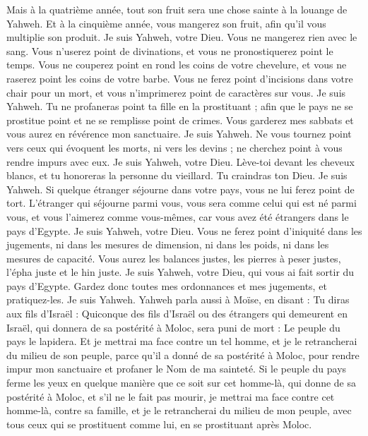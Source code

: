 \begin{multicols}{2}
Mais à la quatrième année, tout son fruit sera une chose sainte à la louange de Yahweh.
Et à la cinquième année, vous mangerez son fruit, afin qu'il vous multiplie son produit. Je suis Yahweh, votre Dieu.
Vous ne mangerez rien avec le sang. Vous n'userez point de divinations, et vous ne pronostiquerez point le temps.
Vous ne couperez point en rond les coins de votre chevelure, et vous ne raserez point les coins de votre barbe.
Vous ne ferez point d'incisions dans votre chair pour un mort, et vous n'imprimerez point de caractères sur vous. Je suis Yahweh.
Tu ne profaneras point ta fille en la prostituant ; afin que le pays ne se prostitue point et ne se remplisse point de crimes.
Vous garderez mes sabbats et vous aurez en révérence mon sanctuaire. Je suis Yahweh.
Ne vous tournez point vers ceux qui évoquent les morts, ni vers les devins ; ne cherchez point à vous rendre impurs avec eux. Je suis Yahweh, votre Dieu.
Lève-toi devant les cheveux blancs, et tu honoreras la personne du vieillard. Tu craindras ton Dieu. Je suis Yahweh.
Si quelque étranger séjourne dans votre pays, vous ne lui ferez point de tort.
L'étranger qui séjourne parmi vous, vous sera comme celui qui est né parmi vous, et vous l'aimerez comme vous-mêmes, car vous avez été étrangers dans le pays d'Egypte. Je suis Yahweh, votre Dieu.
Vous ne ferez point d'iniquité dans les jugements, ni dans les mesures de dimension, ni dans les poids, ni dans les mesures de capacité.
Vous aurez les balances justes, les pierres à peser justes, l'épha juste et le hin juste. Je suis Yahweh, votre Dieu, qui vous ai fait sortir du pays d'Egypte.
Gardez donc toutes mes ordonnances et mes jugements, et pratiquez-les. Je suis Yahweh.
\VerseOne{}Yahweh parla aussi à Moïse, en disant :
Tu diras aux fils d'Israël : Quiconque des fils d'Israël ou des étrangers qui demeurent en Israël, qui donnera de sa postérité à Moloc, sera puni de mort : Le peuple du pays le lapidera.
Et je mettrai ma face contre un tel homme, et je le retrancherai du milieu de son peuple, parce qu'il a donné de sa postérité à Moloc, pour rendre impur mon sanctuaire et profaner le Nom de ma sainteté.
Si le peuple du pays ferme les yeux en quelque manière que ce soit sur cet homme-là, qui donne de sa postérité à Moloc, et s'il ne le fait pas mourir,
je mettrai ma face contre cet homme-là, contre sa famille, et je le retrancherai du milieu de mon peuple, avec tous ceux qui se prostituent comme lui, en se prostituant après Moloc.

\end{multicols}
